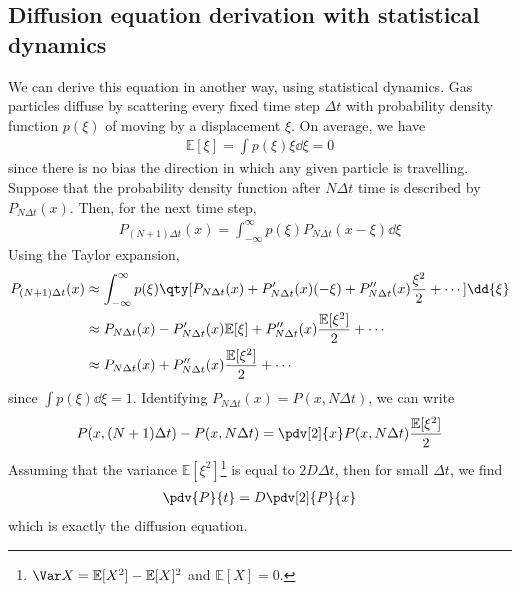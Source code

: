 \subsection{Diffusion equation derivation with statistical dynamics}
We can derive this equation in another way, using statistical dynamics.
Gas particles diffuse by scattering every fixed time step $\Delta t$ with probability density function $p(\xi)$ of moving by a displacement $\xi$.
On average, we have
\begin{align*}
	\mathbb{E}[\xi] = \int p(\xi) \xi \dd{\xi} = 0
\end{align*}
since there is no bias the direction in which any given particle is travelling.
Suppose that the probability density function after $N\Delta t$ time is described by $P_{N \Delta t}(x)$.
Then, for the next time step,
\begin{align*}
	P_{(N+1)\Delta t}(x) = \int_{-\infty}^\infty p(\xi) P_{N \Delta t}(x - \xi) \dd{\xi}
\end{align*}
Using the Taylor expansion,
\begin{align*}
	P_{(N+1)\Delta t}(x) & \approx \int_{-\infty}^\infty p(\xi) \qty[P_{N \Delta t}(x) + P_{N \Delta t}'(x)(-\xi) + P_{N \Delta t}''(x)\frac{\xi^2}{2} + \cdots] \dd{\xi} \\
	& \approx P_{N \Delta t}(x) - P_{N \Delta t}'(x) \mathbb{E}[\xi] + P_{N \Delta t}''(x) \frac{\mathbb{E}[\xi^2]}{2} + \cdots \\
	& \approx P_{N \Delta t}(x) + P_{N \Delta t}''(x) \frac{\mathbb{E}[\xi^2]}{2} + \cdots
\end{align*}
since $\int p(\xi) \dd{\xi} = 1$.
Identifying $P_{N \Delta t}(x) = P(x, N\Delta t)$, we can write
\begin{align*}
	P(x, (N+1)\Delta t) - P(x, N \Delta t) = \pdv[2]{x} P(x, N\Delta t) \frac{\mathbb{E}[\xi^2]}{2}
\end{align*}
Assuming that the variance $\mathbb{E}[\xi^2]$\footnote{$\Var X = \mathbb{E}[X^2] - \mathbb{E}[X]^2$ and $\mathbb{E}[X] = 0$.} is equal to $2D \Delta t$, then for small $\Delta t$, we find
\begin{align} \label{eq:4.4}
	\pdv{P}{t} = D \pdv[2]{P}{x}
\end{align}
which is exactly the diffusion equation.

